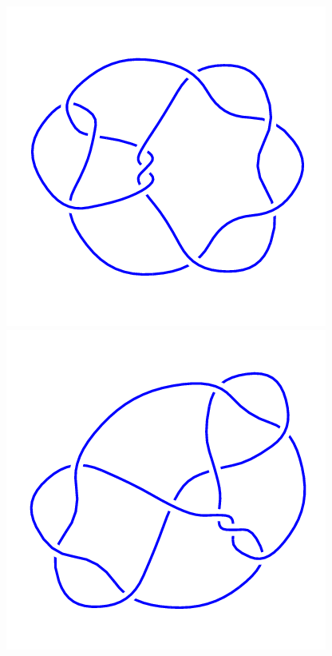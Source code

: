 \begin{figure}[H]
\begin{minipage}[b]{.18\linewidth}
    \end{minipage}
    \begin{minipage}[b]{.18\linewidth}
        \centering
        \includegraphics[width=\linewidth]{../data/10_139.png}
    \end{minipage}
    \begin{minipage}[b]{.18\linewidth}
        \centering
        \includegraphics[width=\linewidth]{../data/10_140.png}

\end{minipage}
\end{figure}
